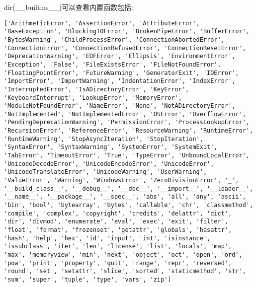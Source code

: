 \documentclass[twoside,11pt]{book}
\begin{document}
dir(\_\_builtins\_\_)可以查看内置函数包括:
\begin{lstlisting}
['ArithmeticError', 'AssertionError', 'AttributeError', 'BaseException', 'BlockingIOError', 'BrokenPipeError', 'BufferError', 'BytesWarning', 'ChildProcessError', 'ConnectionAbortedError', 'ConnectionError', 'ConnectionRefusedError', 'ConnectionResetError', 'DeprecationWarning', 'EOFError', 'Ellipsis', 'EnvironmentError', 'Exception', 'False', 'FileExistsError', 'FileNotFoundError', 'FloatingPointError', 'FutureWarning', 'GeneratorExit', 'IOError', 'ImportError', 'ImportWarning', 'IndentationError', 'IndexError', 'InterruptedError', 'IsADirectoryError', 'KeyError', 'KeyboardInterrupt', 'LookupError', 'MemoryError', 'ModuleNotFoundError', 'NameError', 'None', 'NotADirectoryError', 'NotImplemented', 'NotImplementedError', 'OSError', 'OverflowError', 'PendingDeprecationWarning', 'PermissionError', 'ProcessLookupError', 'RecursionError', 'ReferenceError', 'ResourceWarning', 'RuntimeError', 'RuntimeWarning', 'StopAsyncIteration', 'StopIteration', 'SyntaxError', 'SyntaxWarning', 'SystemError', 'SystemExit', 'TabError', 'TimeoutError', 'True', 'TypeError', 'UnboundLocalError', 'UnicodeDecodeError', 'UnicodeEncodeError', 'UnicodeError', 'UnicodeTranslateError', 'UnicodeWarning', 'UserWarning', 'ValueError', 'Warning', 'WindowsError', 'ZeroDivisionError', '_', '__build_class__', '__debug__', '__doc__', '__import__', '__loader__', '__name__', '__package__', '__spec__', 'abs', 'all', 'any', 'ascii', 'bin', 'bool', 'bytearray', 'bytes', 'callable', 'chr', 'classmethod', 'compile', 'complex', 'copyright', 'credits', 'delattr', 'dict', 'dir', 'divmod', 'enumerate', 'eval', 'exec', 'exit', 'filter', 'float', 'format', 'frozenset', 'getattr', 'globals', 'hasattr', 'hash', 'help', 'hex', 'id', 'input', 'int', 'isinstance', 'issubclass', 'iter', 'len', 'license', 'list', 'locals', 'map', 'max', 'memoryview', 'min', 'next', 'object', 'oct', 'open', 'ord', 'pow', 'print', 'property', 'quit', 'range', 'repr', 'reversed', 'round', 'set', 'setattr', 'slice', 'sorted', 'staticmethod', 'str', 'sum', 'super', 'tuple', 'type', 'vars', 'zip']
\end{lstlisting}
\end{document}

